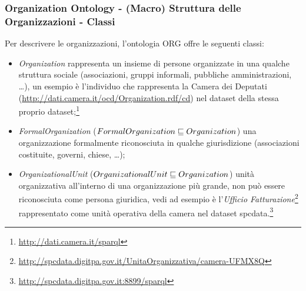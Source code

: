 \documentclass[8pt]{beamer}
\begin{document}
\begin{frame}
  \frametitle{Organization Ontology - (Macro) Struttura delle Organizzazioni - Classi}
  
  Per descrivere le organizzazioni, l'ontologia ORG offre le seguenti classi:  
  \begin{itemize}[<+->]
   \item \emph{Organization} rappresenta un insieme di persone organizzate in una
   qualche struttura sociale (associazioni, gruppi informali, pubbliche amministrazioni, \ldots),
   un esempio \`e l'individuo che rappresenta la Camera dei Deputati (\url{http://dati.camera.it/ocd/Organization.rdf/cd})
   nel dataset della stessa proprio dataset;\footnote{\url{http://dati.camera.it/sparql}}
   \item \emph{FormalOrganization} ($FormalOrganization \sqsubseteq Organization$) una organizzazione 
   formalmente riconosciuta in qualche giurisdizione (associazioni costituite, governi, chiese, \ldots);
   \item \emph{OrganizationalUnit} ($OrganizationalUnit \sqsubseteq Organization$) unit\`a organizzativa
   all'interno di una organizzazione pi\`u grande, non pu\`o essere riconosciuta come persona giuridica,
   vedi ad esempio \`e l'\emph{Ufficio Fatturazione}\footnote{\url{http://spcdata.digitpa.gov.it/UnitaOrganizzativa/camera-UFMX8Q}}
   rappresentato come unit\`a operativa della camera nel dataset spcdata.\footnote{\url{http://spcdata.digitpa.gov.it:8899/sparql}}
  \end{itemize}
\end{frame}
\end{document}
